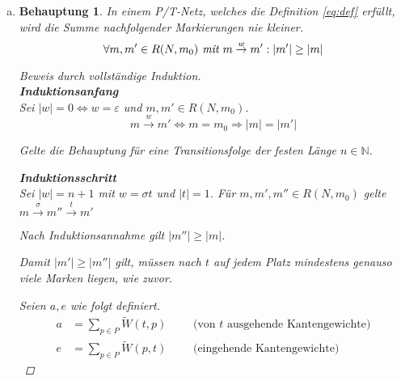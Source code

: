 \documentclass[a4paper]{scrartcl}
\newtheorem*{behaupt}{Behauptung}
\newcommand{\gdw}{\Leftrightarrow}
\begin{document}
\begin{enumerate}
\begin{enumerate}[(a)]
            \item
                \begin{behaupt}
                    In einem P/T-Netz, welches die Definition \eqref{eq:def}
                    erfüllt, wird die Summe nachfolgender Markierungen nie
                    kleiner.
                    \begin{equation}
                        \forall m, m' \in R(N, m_0) \emph{ mit } m \stackrel{w}{\to} m'
                        : |m'| \geq |m|
                    \end{equation}
                    \begin{proof}[Beweis durch vollständige Induktion] \hfill \\
                        \textbf{Induktionsanfang} \\
                        Sei $|w| = 0 \gdw w = \varepsilon$ und $m, m' \in R(N, m_0)$.
                        \begin{equation}
                            m \stackrel{w}{\to} m' \gdw m = m_0 \Rightarrow |m| = |m'|
                        \end{equation}

                        Gelte die Behauptung für eine Transitionsfolge der
                        festen Länge $n \in \mathbb{N}$.

                        \textbf{Induktionsschritt} \\
                        Sei $|w| = n + 1$ mit $w = \sigma t$ und $|t| = 1$.
                        Für $m, m', m'' \in R(N, m_0)$ gelte
                        $m \stackrel{\sigma}{\to} m'' \stackrel{t}{\to} m'$

                        Nach Induktionsannahme gilt $|m''| \geq |m|$.

                        Damit $|m'| \geq |m''|$ gilt, müssen nach $t$ auf jedem
                        Platz mindestens genauso viele Marken liegen, wie
                        zuvor.

                        Seien $a, e$ wie folgt definiert.
                        \begin{align}
                            a &= \sum_{p \in P} \widetilde{W}(t, p)
                            \qquad \text{ (von $t$ ausgehende Kantengewichte)} \\
                            e &= \sum_{p \in P} \widetilde{W}(p, t)
                            \qquad \text{ (eingehende Kantengewichte)}
                        \end{align}
                        

\end{proof}
\end{behaupt}
\end{enumerate}
\end{enumerate}
\end{document}
